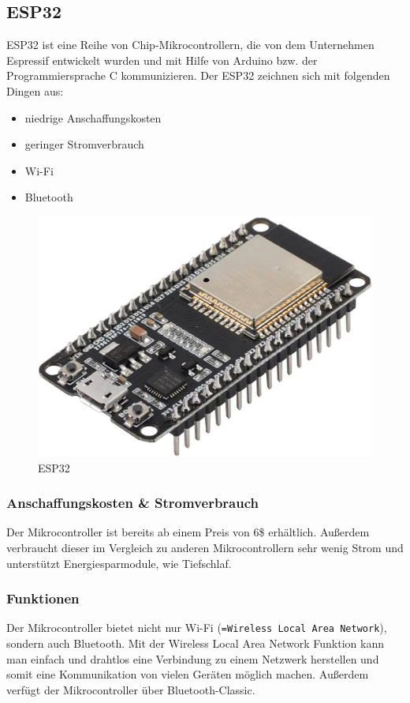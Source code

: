 \newpage
\subsection{ESP32} \label{ESP32}

ESP32 ist eine Reihe von Chip-Mikrocontrollern, die von dem Unternehmen Espressif entwickelt wurden und mit Hilfe von Arduino bzw. der Programmiersprache C kommunizieren. Der ESP32 \textcite{ESP32} zeichnen sich mit folgenden Dingen aus:

\begin{itemize}
	\item niedrige Anschaffungskosten
	\item geringer Stromverbrauch
	\item Wi-Fi
	\item Bluetooth
\end{itemize}


\begin{figure}[H]
	\centering
	\includegraphics[width=0.7\linewidth]{images/ESP32.jpg}
	\caption[ESP32]{ESP32}
	\label{fig:ESP32}
\end{figure}

\subsubsection{Anschaffungskosten \& Stromverbrauch}

Der Mikrocontroller ist bereits ab einem Preis von 6\$ erhältlich. Außerdem verbraucht dieser im Vergleich zu anderen Mikrocontrollern sehr wenig Strom und unterstützt Energiesparmodule, wie Tiefschlaf.

\subsubsection{Funktionen}

Der Mikrocontroller bietet nicht nur Wi-Fi (\texttt{=Wireless Local Area Network}), sondern auch Bluetooth. Mit der Wireless Local Area Network Funktion kann man einfach und drahtlos eine Verbindung zu einem Netzwerk herstellen und somit eine Kommunikation von vielen Geräten möglich machen. Außerdem verfügt der Mikrocontroller über Bluetooth-Classic.

